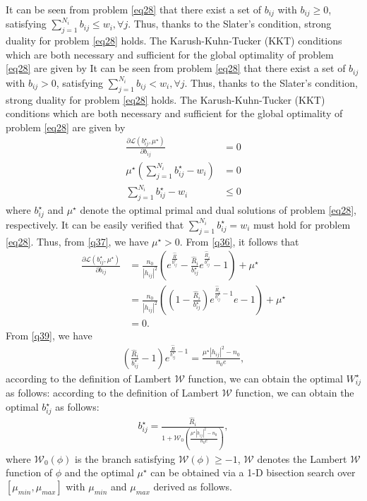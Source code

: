 \documentclass[journal]{IEEEtran}
\begin{document}
\begin{IEEEkeywords}
It can be seen from problem \eqref{eq28} that there exist a set of $b_{ij}$ with $b_{ij} \geq 0$, satisfying $\sum\limits_{j = 1}^{N_i} b_{ij} \leq w_i, \forall j$. Thus, thanks to the Slater's condition, strong duality for problem \eqref{eq28} holds. The Karush-Kuhn-Tucker (KKT) conditions which are both necessary and 	sufficient for the  global optimality of problem \eqref{eq28} are given by
It can be seen from problem \eqref{eq28} that there exist a set of $b_{ij}$ with $b_{ij} > 0$, satisfying $\sum\limits_{j = 1}^{N_i} b_{ij} < w_i, \forall j$. Thus, thanks to the Slater's condition, strong duality for problem \eqref{eq28} holds. The Karush-Kuhn-Tucker (KKT) conditions which are both necessary and 	sufficient for the  global optimality of problem \eqref{eq28} are given by
\begin{align}
\frac{\partial \mathcal{L}\left({b_{ij}^\star}, \mu^\star\right)}{\partial b_{ij}} &= 0 \label{q36} \\
\mu^\star\left(\sum\limits_{j = 1}^{N_i}b_{ij}^\star - w_i\right) &= 0 \label{q37} \\
\sum\limits_{j = 1}^{N_i}b_{ij}^\star - w_i & \leq 0 \label{q38}
\end{align} 
where $b_{ij}^\star$ and $\mu^\star$ denote the optimal primal and dual solutions of problem \eqref{eq28}, respectively. It can be easily verified that $\sum\limits_{j = 1}^{N_i} b_{ij}^\star = w_i$ must hold for problem \eqref{eq28}. Thus, from \eqref{q37}, we have $\mu^\star > 0$. From \eqref{q36}, it follows that 
\begin{align}
\frac{\partial \mathcal{L} \left(b_{ij}^\star, \mu^\star \right)}{\partial b_{ij}} &= \frac{n_0}{\left|h_{ij}\right|^2} \left(e^{\frac{\hat{R}}{b_{ij}^\star}} -  \frac{\hat{R}_i}{b_{ij}^\star} e^{\frac{\hat{R}_i}{b_{ij}^\star}} - 1\right) + \mu^\star \nonumber \\
& =  \frac{n_0}{\left|h_{ij}\right|^2}\left(\left(1 - \frac{\hat{R}_i}{b_{ij}^\star}\right)e^{\frac{\hat{R}_i}{b_{ij}^\star} - 1}e - 1\right) + \mu^\star \nonumber \\
& = 0. \label{q39}
\end{align}
From \eqref{q39}, we have
\begin{align}
\left(\frac{\hat{R}_i}{b_{ij}^\star} - 1\right) e^{\frac{\hat{R}}{b_{ij}^\star} - 1} = \frac{\mu^\star \left|h_{ij}\right|^2 - n_0}{n_0 e},
\end{align}
according to the definition of Lambert $\mathcal{W}$ function, we can obtain the optimal $W_{ij}^\star$ as follows:
according to the definition of Lambert $\mathcal{W}$ function, we can obtain the optimal $b_{ij}^\star$ as follows:
\begin{align}
b_{ij}^\star = \frac{\hat{R}_i}{1 + \mathcal{W}_0\left(\frac{\mu^\star \left|h_{ij}\right|^2 - n_0}{n_0 e}\right)} \label{q41},
\end{align}
where $\mathcal{W}_0\left(\phi\right)$ is the branch satisfying $\mathcal{W}\left(\phi\right) \geq -1$, $\mathcal{W}$ denotes the Lambert $\mathcal{W}$ function of $\phi$ \cite{RMCorless} and the optimal $\mu^\star$ can be obtained via a 1-D bisection search over $\left[\mu_{min}, \mu_{max}\right]$ with $\mu_{min} $ and $\mu_{max}$ derived as follows.


\end{IEEEkeywords}
\end{document}
